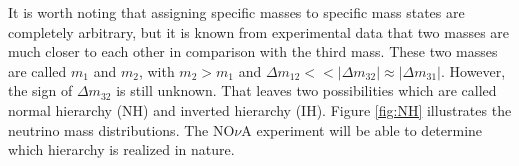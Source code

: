 It is worth noting that assigning specific masses to specific mass states are completely 
arbitrary, but it is known from experimental data that two masses are much closer to each other 
in comparison with the third mass. These two masses are called $m_1$ and $m_2$, with $m_2 > m_1$ 
and $\Delta m_{12} << |\Delta m_{32}| \approx |\Delta m_{31}|$. However, the sign of $\Delta m_{32}$ 
is still unknown. That leaves two possibilities which are called normal hierarchy (NH) and inverted 
hierarchy (IH). Figure \ref{fig:NH} illustrates the neutrino mass distributions. The NO$\nu$A experiment 
will be able to determine which hierarchy is realized in nature.


